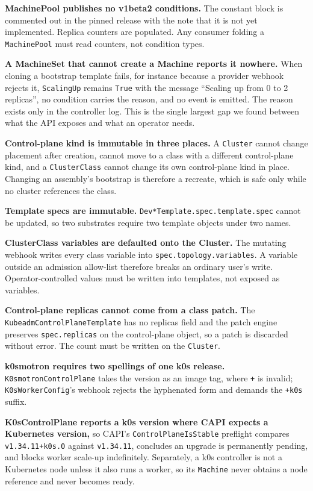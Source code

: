 \documentclass[conference]{IEEEtran}
\begin{document}
\textbf{MachinePool publishes no v1beta2 conditions.} The constant block is
commented out in the pinned release with the note that it is not yet implemented.
Replica counters are populated. Any consumer folding a \texttt{MachinePool} must
read counters, not condition types.

\textbf{A MachineSet that cannot create a Machine reports it nowhere.} When
cloning a bootstrap template fails, for instance because a provider webhook rejects
it, \texttt{ScalingUp} remains \texttt{True} with the message ``Scaling up from 0
to 2 replicas'', no condition carries the reason, and no event is emitted. The
reason exists only in the controller log. This is the single largest gap we found
between what the API exposes and what an operator needs.

\textbf{Control-plane kind is immutable in three places.} A \texttt{Cluster}
cannot change placement after creation, cannot move to a class with a different
control-plane kind, and a \texttt{ClusterClass} cannot change its own
control-plane kind in place. Changing an assembly's bootstrap is therefore a
recreate, which is safe only while no cluster references the class.

\textbf{Template specs are immutable.} \texttt{Dev*Template.spec.template.spec}
cannot be updated, so two substrates require two template objects under two names.

\textbf{ClusterClass variables are defaulted onto the Cluster.} The mutating
webhook writes every class variable into \texttt{spec.topology.variables}. A
variable outside an admission allow-list therefore breaks an ordinary user's write.
Operator-controlled values must be written into templates, not exposed as
variables.

\textbf{Control-plane replicas cannot come from a class patch.} The
\texttt{KubeadmControlPlaneTemplate} has no replicas field and the patch engine
preserves \texttt{spec.replicas} on the control-plane object, so a patch is
discarded without error. The count must be written on the \texttt{Cluster}.

\textbf{k0smotron requires two spellings of one k0s release.}
\texttt{K0smotronControlPlane} takes the version as an image tag, where
\texttt{+} is invalid; \texttt{K0sWorkerConfig}'s webhook rejects the hyphenated
form and demands the \texttt{+k0s} suffix.

\textbf{K0sControlPlane reports a k0s version where CAPI expects a Kubernetes
version,} so CAPI's \texttt{ControlPlaneIsStable} preflight compares
\texttt{v1.34.11+k0s.0} against \texttt{v1.34.11}, concludes an upgrade is
permanently pending, and blocks worker scale-up indefinitely. Separately, a k0s
controller is not a Kubernetes node unless it also runs a worker, so its
\texttt{Machine} never obtains a node reference and never becomes ready.
\end{document}

